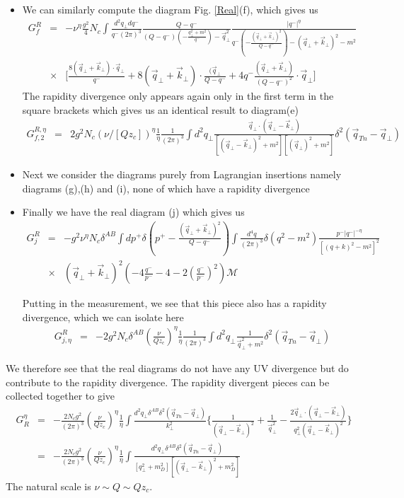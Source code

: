 \documentclass[letter,11pt]{article}
\newcommand{\nn}{\nonumber}
\newcommand{\bea}{\begin{eqnarray}}
\newcommand{\eea}{\end{eqnarray}}
\def\nn{\nonumber}
\begin{document}
\begin{itemize}
\item
We can similarly compute the diagram Fig. \ref{Real}(f), which gives us  
\bea
  G_{f}^R&=& -\nu^{\eta}\frac{g^2}{4}N_c\int \frac{d^2q_{\perp}dq^-}{q^-(2\pi)^3}\frac{Q-q^-}{(Q-q^-)(-\frac{q_{\perp}^2+m^2}{q^-})-\vec{q}_{\perp}^2}\frac{|q^-|^{\eta}}{q^-(-\frac{(\vec{q}_{\perp}+\vec{k}_{\perp})^2}{Q-q^-})-(\vec{q}_{\perp}+\vec{k}_{\perp})^2-m^2} \nn\\
&\times& \Bigg[\frac{8(\vec{q}_{\perp}+\vec{k}_{\perp})\cdot \vec{q}_{\perp}}{q^-} + 8(\vec{q}_{\perp}+\vec{k}_{\perp})\cdot\frac{(\vec{q}_{\perp}}{Q-q^-}+4q^-\frac{(\vec{q}_{\perp}+\vec{k}_{\perp})}{(Q-q^-)^2}\cdot\vec{q}_{\perp}\Bigg]
\eea
The rapidity divergence only appears again only in the first term in the square brackets which gives us an identical result to diagram(e)
\bea
G_{f,2}^{R,\eta}&=&  2g^2N_c(\nu/[Qz_c])^{\eta}\frac{1}{\eta}\frac{1}{(2\pi)^3}\int d^2q_{\perp}\frac{\vec{q}_{\perp}\cdot (\vec{q}_{\perp}-\vec{k}_{\perp})}{[(\vec{q}_{\perp}-\vec{k}_{\perp})^2+m^2][(\vec{q}_{\perp})^2+m^2]}\delta^2(\vec{q}_{Tn}-\vec{q}_{\perp})\nn
\eea
\item
Next we consider the diagrams purely from Lagrangian insertions namely diagrams (g),(h) and (i), none of which have a rapidity divergence
\item
Finally we have the real diagram (j) which gives us
\bea
 G_{j}^R&=& -g^2\nu^{\eta}N_c\delta^{AB}\int dp^+ \delta( p^+-\frac{(\vec{q}_{\perp}+\vec{k}_{\perp})^2}{Q-q^-}) \int \frac{d^4q}{(2\pi)^3}\delta(q^2-m^2) \frac{p^-|q^-|^{-\eta}}{[(q+k)^2-m^2]^2}\nn\\
&\times&(\vec{q}_{\perp}+\vec{k}_{\perp})^2\left(-4\frac{q^-}{p^-}-4-2\left(\frac{q^-}{p^-}\right)^2\right)\mathcal{M}
\eea

Putting in the measurement, we see that this piece also has a rapidity divergence, which we can isolate here 
 \bea
  G_{j,\eta}^{R} &= &   -2g^2N_c\delta^{AB}\left(\frac{\nu}{Qz_c}\right)^{\eta}\frac{1}{\eta}\frac{1}{(2\pi)^3} \int d^2q_{\perp}\frac{1}{\vec{q}_{\perp}^2+m^2}\delta^2(\vec{q}_{Tn}-\vec{q}_{\perp})
\eea
\end{itemize}

We therefore see that the real diagrams do not have any UV divergence but do contribute to the rapidity divergence. 
The rapidity divergent pieces can be collected together to give 
\bea
G_R^{\eta}&=& -\frac{2N_cg^2}{(2\pi)^3}\left(\frac{\nu}{Qz_c}\right)^{\eta}\frac{1}{\eta}\int \frac{d^2q_{\perp}\delta^{AB}\delta^2(\vec{q}_{Tn}-\vec{q}_{\perp})}{k_{\perp}^2}\Bigg\{\frac{1}{(\vec{q}_{\perp}-\vec{k}_{\perp})^2}+\frac{1}{\vec{q}_{\perp}^2}-\frac{2\vec{q}_{\perp}\cdot (\vec{q}_{\perp}-\vec{k}_{\perp})}{q_{\perp}^2(\vec{q}_{\perp}-\vec{k}_{\perp})^2}\Bigg\}\nn\\
&=& -\frac{2N_cg^2}{(2\pi)^3}\left(\frac{\nu}{Qz_c}\right)^{\eta}\frac{1}{\eta}\int \frac{d^2q_{\perp}\delta^{AB}\delta^2(\vec{q}_{Tn}-\vec{q}_{\perp})}{[q_{\perp}^2+m_D^2][(\vec{q}_{\perp}-\vec{k}_{\perp})^2+m_D^2]}
\label{RealRapid}
\eea
The natural scale is $\nu \sim Q \sim Qz_{c}$.
 
\end{document}
